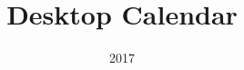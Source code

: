 \documentclass[table]{beamer}
\title[Sujit]{{\color{mymaroon} \setlength{\fboxrule}{2pt} } \\ Desktop Calendar \\ \vspace*{-2cm}}
\author{}
\institute{}
\date{\Huge{2017}}
\begin{document}
\beamertemplatenavigationsymbolsempty
\maketitle

\newcommand{\highlight}[1]{{\color{Red}(#1)}}
\newcommand{\comment}[1]{\begin{tiny}
{\color{blue}(#1)}
\end{tiny}}
\newcommand{\myheader}[1]{
	{\color{mymaroon}
		\begin{Large}
			\begin{center}
				{#1}
			\end{center}
		\end{Large}
	}
}

\newcommand{\myminorheader}[1]{
	{\color{purple}
		\begin{large}
			{#1}
		\end{large}
	}
}

\newcommand{\monthcolour}{myindigo}
\newcommand{\headercolour}{yellow!25}
\newcommand{\phbordercolour}{mymaroon}
\newcommand{\workingdaycolour}{black}
\newcommand{\holidaycolour}{red}
\newcommand{\weekendcolour}{mymaroon}

\fboxsep=2pt%
\fboxrule=2pt%

\end{document}
